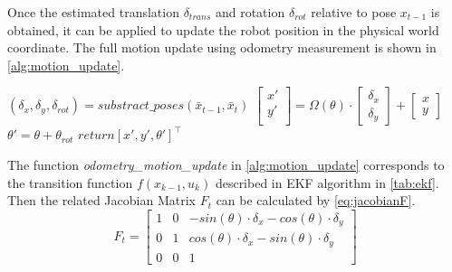 Once the estimated translation $\delta_{trans}$ and rotation $\delta_{rot}$ relative to pose $x_{t-1}$ is obtained, it can be applied to update the robot position in the physical world coordinate. The full motion update using odometry measurement is shown in \autoref{alg:motion_update}.

\newcommand{\transfunc}{odometry\_motion\_update}

\begin{algorithm}                      
  \caption{\transfunc ($x_{t-1}$, $u_t$)}         %
\label{alg:motion_update}                           
\begin{algorithmic}[1]                    
  \State $(\delta_{x}, \delta_{y}, \delta_{rot}) = substract\_poses (\bar{x}_{t-1}, \bar{x}_{t})$
  \State $
\begin{bmatrix}
  x'\\ 
  y'\\ 
\end{bmatrix}
= 
\Omega(\theta)
\cdot 
\begin{bmatrix}
  \delta_{x}\\ 
  \delta_{y} 
\end{bmatrix} +
\begin{bmatrix}
  x\\ 
  y 
\end{bmatrix}\
$
\State $\theta' = \theta + \theta_{rot}$ 
\State $return [x', y', \theta']^\top$
\end{algorithmic}
\end{algorithm}

The function \textit{\transfunc} in \autoref{alg:motion_update} corresponds to the transition function $f(x_{k-1}, u_{k})$ described in \gls{EKF} algorithm in \autoref{tab:ekf}. Then the related Jacobian Matrix $F_t$ can be calculated by \autoref{eq:jacobianF}.
\begin{equation}\label{eq:jacobianF} 
F_t = 
\begin{bmatrix}
1 & 0 & -sin(\theta)\cdot \delta_x - cos(\theta)\cdot\delta_y\\ 
0 &  1& cos(\theta)\cdot \delta_x  - sin(\theta)\cdot\delta_y\\ 
0 & 0 & 1
\end{bmatrix} 
\end{equation}

